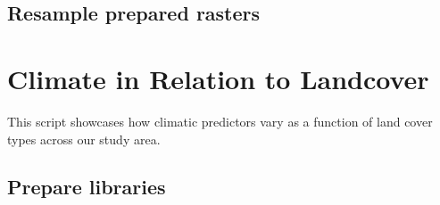 \documentclass[]{article}
\newenvironment{Shaded}{}{}
\newcommand{\CommentTok}[1]{\textcolor[rgb]{0.00,0.50,0.00}{#1}}
\newcommand{\ControlFlowTok}[1]{\textcolor[rgb]{0.00,0.00,1.00}{#1}}
\newcommand{\DataTypeTok}[1]{#1}
\newcommand{\DecValTok}[1]{#1}
\newcommand{\KeywordTok}[1]{\textcolor[rgb]{0.00,0.00,1.00}{#1}}
\newcommand{\NormalTok}[1]{#1}
\newcommand{\OperatorTok}[1]{#1}
\newcommand{\OtherTok}[1]{\textcolor[rgb]{1.00,0.25,0.00}{#1}}
\newcommand{\StringTok}[1]{\textcolor[rgb]{0.00,0.50,0.50}{#1}}
\begin{document}
\hypertarget{resample-prepared-rasters}{%
\subsection{Resample prepared rasters}\label{resample-prepared-rasters}}

\begin{Shaded}
\end{Shaded}

\hypertarget{climate-in-relation-to-landcover}{%
\section{Climate in Relation to Landcover}\label{climate-in-relation-to-landcover}}

This script showcases how climatic predictors vary as a function of land cover types across our study area.

\hypertarget{prepare-libraries-1}{%
\subsection{Prepare libraries}\label{prepare-libraries-1}}
\end{document}
